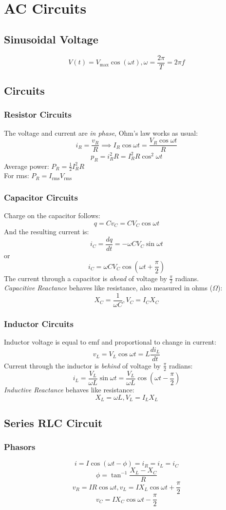\section{AC Circuits}
\subsection{Sinusoidal Voltage}
$$V(t)=V_{\text{max}}\cos{(\omega t)}, \omega=\frac{2\pi}{T}=2\pi f$$
\subsection{Circuits}
\subsubsection{Resistor Circuits}
The voltage and current are \emph{in phase}, Ohm's law works as usual:
$$i_R=\frac{v_R}{R}\implies I_R\cos{\omega t} = \frac{V_R\cos{\omega t}}{R}$$
$$p_R=i_R^2R=I_R^2R\cos^2\omega t$$
Average power: $P_R=\frac{1}{2}I_R^2R$\\
For rms: $P_R=I_{\text{rms}}V_{\text{rms}}$
\subsubsection{Capacitor Circuits}
Charge on the capacitor follows:
$$q=Cv_C=CV_C\cos{\omega t}$$
And the resulting current is:
$$i_C=\frac{dq}{dt}=-\omega CV_C\sin{\omega t}$$
or
$$i_C=\omega CV_C\cos{(\omega t + \frac{\pi}{2})}$$
The current through a capacitor is \emph{ahead} of voltage by $\frac{\pi}{2}$ radians.\\
\emph{Capacitive Reactance} behaves like resistance, also measured in ohms ($\Omega$):
$$X_C=\frac{1}{\omega C}, V_C=I_CX_C$$
\subsubsection{Inductor Circuits}
Inductor voltage is equal to emf and proportional to change in current:
$$v_L=V_L\cos{\omega t}=L\frac{di_L}{dt}$$
Current through the inductor is \emph{behind} of voltage by $\frac{\pi}{2}$ radians:
$$i_L=\frac{V_L}{\omega L}\sin{\omega t}=\frac{V_L}{\omega L}\cos{(\omega t - \frac{\pi}{2})}$$
\emph{Inductive Reactance} behaves like resistance:
$$X_L = \omega L, V_L=I_LX_L$$
\subsection{Series RLC Circuit}
\subsubsection{Phasors}
$$i=I\cos{(\omega t - \phi)}=i_R=i_L=i_C$$
$$\phi=\tan^{-1}{\frac{X_L-X_C}{R}}$$
$$v_R=IR\cos{\omega t}, v_L=IX_L\cos{\omega t + \frac{\pi}{2}}$$
$$v_C=IX_C\cos{\omega t - \frac{\pi}{2}}$$
